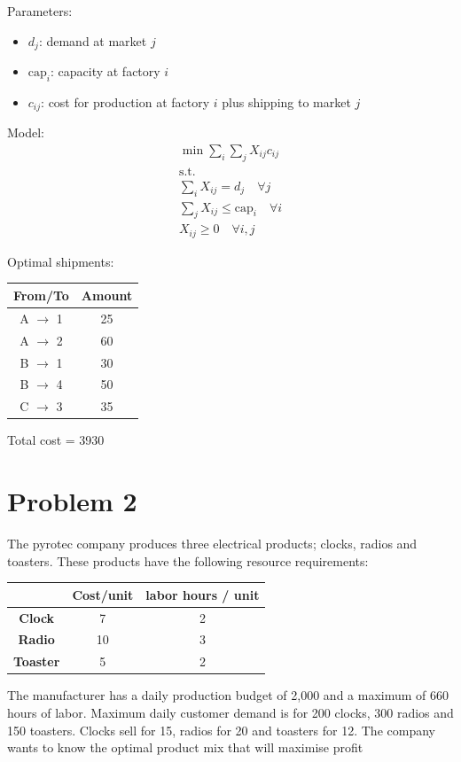 \documentclass[10pt]{article}
\begin{document}
Parameters: 
\begin{itemize}
    \item $d_j $: demand at market $j $
    \item $\text{cap}_i $: capacity at factory $i $
    \item $c_{ij} $: cost for production at factory $i $ plus shipping to market $j $
\end{itemize}
Model: 
\begin{gather*}
    \min\sum_i\sum_jX_{ij}c_{ij}\\
    \text{s.t.}\\
    \sum_iX_{ij} = d_j\quad\forall j\\
    \sum_jX_{ij} \le \text{cap}_i \quad\forall i\\
    X_{ij} \ge 0\quad\forall i,j
\end{gather*}

Optimal shipments:

\begin{center}
    \begin{tabular}{|c|c|}
        \hline 
        \textbf{From/To} & \textbf{Amount} \\\hline 
        A $\to $ 1 & 25\\\hline
        A $\to $ 2 & 60\\\hline
        B $\to $ 1 & 30\\\hline
        B $\to $ 4 & 50\\\hline
        C $\to $ 3 & 35\\\hline
    \end{tabular}
\end{center}

Total cost = 3930
\newpage 
\section{Problem 2}
The pyrotec company produces three electrical products; clocks, radios and toasters. These products have the following resource requirements: 
\begin{center}
    \begin{tabular}{|c|c|c|}
        \hline 
        & \textbf{Cost/unit} & \textbf{labor hours / unit}\\\hline 
        \textbf{Clock} & 7 & 2\\\hline 
        \textbf{Radio} & 10 & 3\\\hline 
        \textbf{Toaster} & 5 & 2\\\hline 
    \end{tabular}
\end{center}
The manufacturer has a daily production budget of 2,000 and a maximum of 660 hours of labor. Maximum daily customer demand is for 200 clocks, 300 radios and 150 toasters. Clocks sell for 15, radios for 20 and toasters for 12. The company wants to know the optimal product mix that will maximise profit
\end{document}
